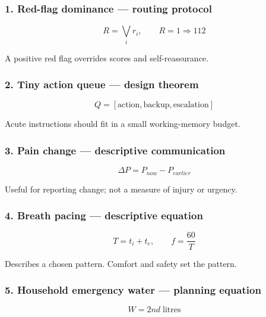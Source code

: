 \hypertarget{red-flag-dominance-routing-protocol}{%
\subsubsection{1. Red-flag dominance --- routing
protocol}\label{red-flag-dominance-routing-protocol}}

\[R = \bigvee_i r_i, \qquad R=1 \Rightarrow 112\]

A positive red flag overrides scores and self-reassurance.

\hypertarget{tiny-action-queue-design-theorem}{%
\subsubsection{2. Tiny action queue --- design
theorem}\label{tiny-action-queue-design-theorem}}

\[Q=[\text{action},\text{backup},\text{escalation}]\]

Acute instructions should fit in a small working-memory budget.

\hypertarget{pain-change-descriptive-communication}{%
\subsubsection{3. Pain change --- descriptive
communication}\label{pain-change-descriptive-communication}}

\[\Delta P=P_{now}-P_{earlier}\]

Useful for reporting change; not a measure of injury or urgency.

\hypertarget{breath-pacing-descriptive-equation}{%
\subsubsection{4. Breath pacing --- descriptive
equation}\label{breath-pacing-descriptive-equation}}

\[T=t_i+t_e, \qquad f=\frac{60}{T}\]

Describes a chosen pattern. Comfort and safety set the pattern.

\hypertarget{household-emergency-water-planning-equation}{%
\subsubsection{5. Household emergency water --- planning
equation}\label{household-emergency-water-planning-equation}}

\[W=2nd\;\text{litres}\]

